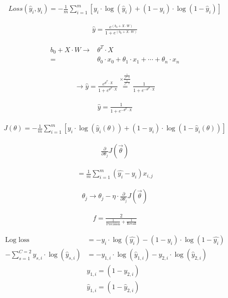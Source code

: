 \documentclass[USenglish,final,authoryear,12pt]{article}
\begin{document}
\begin{align*}
Loss(\hat{y}_i,y_i) = -\frac{1}{m}\sum_{i=1} ^ m\left[ y_i\cdot\log(\hat{y}_i) + (1-y_i)\cdot\log(1-\hat{y}_i)\right]
\end{align*}

\begin{align*}
\hat{y} = \frac{e^{\left(b_0 + X\cdot W\right)}}{1+e^{\left(b_0 + X\cdot W\right)}}
\end{align*}

\begin{align*}
	b_0 + X\cdot W \to& \theta^T\cdot X\\
	=& \theta_0\cdot x_0 + \theta_1\cdot x_1 + \cdots + \theta_n\cdot x_n
\end{align*}

\begin{align*}
\to \hat{y} = \frac{e^{\theta^T\cdot X}}{1+e^{\theta^T\cdot X}} \overset{\times \frac{\frac{1}{e^{\theta^T\cdot X}}}{\frac{1}{e^{\theta^T\cdot X}}}}{=} \frac{1}{1+e^{-\theta^T\cdot X}}
\end{align*}

\begin{align*}
\hat{y} = \frac{1}{1+e^{-\theta^T\cdot X}}
\end{align*}


\begin{align*}
J(\theta) = -\frac{1}{m}\sum_{i=1} ^ m\left[ y_i\cdot\log(\hat{y}_i(\theta)) + (1-y_i)\cdot\log(1-\hat{y}_i(\theta))\right]
\end{align*}

\begin{align*}
\frac{\partial}{\partial\theta_j}J(\vec{\theta})
\end{align*}

\begin{align*}
 = \frac{1}{m}\sum_{i=1}^{m}\left(\hat{y_i}-y_i\right)x_{i,j}
\end{align*}

\begin{align*}
	\theta_j \to \theta_j - \eta\cdot\frac{\partial}{\partial\theta_j}J(\vec{\theta})
\end{align*}

\begin{align*}
	f=\frac{2}{\frac{1}{\text{Precision}}+\frac{1}{\text{Recall}}}
\end{align*}

\begin{align*}
	\text{Log loss} &= -y_i\cdot\log(\hat{y_i}) - (1-y_i)\cdot\log(1-\hat{y_i})\\
	-\sum_{s=1}^{C=2}y_{s,i}\cdot\log(\hat{y}_{s,i})&=-y_{1,i}\cdot\log(\hat{y}_{1,i})-y_{2,i}\cdot\log(\hat{y}_{2,i})\\
	&y_{1,i} = (1-y_{2,i})\\
	&\hat{y}_{1,i} = (1-\hat{y}_{2,i})
\end{align*}
\end{document}
